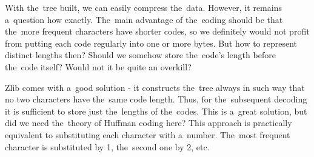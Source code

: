 With the~tree built, we can easily compress the~data. However, it remains a~question how exactly. The~main advantage of the~coding should be that the~more frequent characters have shorter codes, so we definitely would not profit from putting each code regularly into one or more bytes. But how to represent distinct lengths then? Should we somehow store the~code's length before the~code itself? Would not it be quite an overkill? 

Zlib comes with a~good solution - it constructs the~tree always in such way that no two characters have the~same code length. Thus, for the~subsequent decoding it is sufficient to store just the~lengths of the~codes. This is a~great solution, but did we need the~theory of Huffman coding here? This approach is practically equivalent to substituting each character with a~number. The~most frequent character is substituted by 1, the~second one by 2, etc.  


